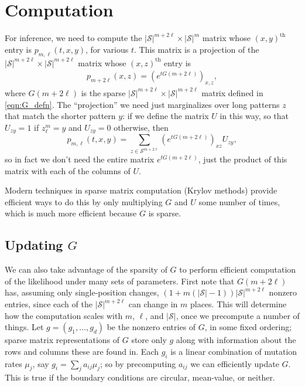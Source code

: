 \documentclass{article}
\newcommand{\calS}{\mathcal{S}}  %
\theoremstyle{plain}
\theoremstyle{definition}
\begin{document}
\section{Computation}

For inference, we need to compute the $|\calS|^{m+2\ell} \times |\calS|^m$ matrix whose $(x,y)^\text{th}$ entry is $p_{m,\ell}(t,x,y)$,
for various $t$.
This matrix is a projection of the $|\calS|^{m+2\ell} \times |\calS|^{m+2\ell}$ matrix whose $(x,z)^\text{th}$ entry is
\begin{align}
    p_{m+2\ell}(x,z) = \left( e^{t G(m+2\ell)} \right)_{x,z} ,
\end{align}
where $G(m+2\ell)$ is the sparse $|\calS|^{m+2\ell} \times |\calS|^{m+2\ell}$ matrix defined in \eqref{eqn:G_defn}.
The ``projection'' we need just marginalizes over long patterns $z$ that match the shorter pattern $y$:
if we define the matrix $U$ in this way, so that $U_{zy}=1$ if $z_\ell^m=y$ and $U_{zy}=0$ otherwise,
then
\[
    p_{m,\ell}(t,x,y) = \sum_{z \in \calS^{m+2\ell}} \left( e^{t G(m+2\ell)} \right)_{xz} U_{zy} ,
\]
so in fact we don't need the entire matrix $e^{t G(m+2\ell)}$,
just the product of this matrix with each of the columns of $U$.

Modern techniques in sparse matrix computation (Krylov methods) provide efficient ways to do this
by only multiplying $G$ and $U$ some number of times, 
which is much more efficient because $G$ is sparse.

\subsection{Updating $G$}

We can also take advantage of the sparsity of $G$ to perform efficient computation of the likelihood
under many sets of parameters.
First note that $G(m+2\ell)$ has, assuming only single-position changes,
$(1+m(|\calS|-1)) |\calS|^{m+2\ell}$ nonzero entries, since each of the $|\calS|^{m+2\ell}$ can change in $m$ places.
This will determine how the computation scales with $m$, $\ell$, and $|\calS|$,
once we precompute a number of things.
Let $g = (g_1, \ldots, g_d)$ be the nonzero entries of $G$, in some fixed ordering;
sparse matrix representations of $G$ store only $g$ along with information about the rows and columns these are found in.
Each $g_i$ is a linear combination of mutation rates $\mu_j$, say $g_i = \sum_j a_{ij} \mu_j$;
so by precomputing $a_{ij}$ we can efficiently update $G$.
This is true if the boundary conditions are circular, mean-value, or neither.
\end{document}
